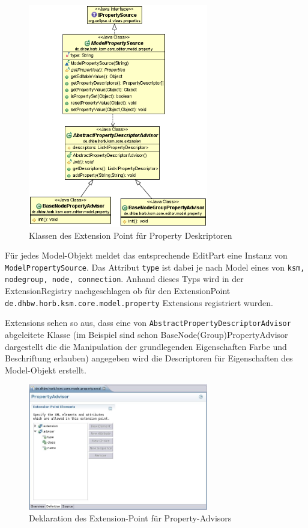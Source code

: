 \documentclass[%
12pt,titlepage,abstracton]{scrreprt}
\begin{document}
\begin{figure}[mt]
\centering
\includegraphics[width=0.7\textwidth]{images/ext-property-descriptors.PNG}
\caption{Klassen des Extension Point für Property Deskriptoren}
\label{fig:ext-property-descriptors}
\end{figure}

Für jedes Model-Objekt meldet das entsprechende EditPart eine Instanz von
\texttt{Model\-Property\-Source}. Das Attribut \texttt{type} ist dabei je nach
Model eines von \texttt{ksm, nodegroup, node, connection}.
Anhand dieses Typs wird in der Extension\-Registry nachgeschlagen ob für den
Extension\-Point \texttt{de.\-dhbw.\-horb.\-ksm.\-core.\-model.\-property}
Extensions registriert wurden.

Extensions sehen so aus, dass eine von
\texttt{Abstract\-Property\-Descriptor\-Advisor} abgeleitete Klasse (im
Beispiel sind schon BaseNode(Group)PropertyAdvisor dargestellt die die
Manipulation der grundlegenden Eigenschaften Farbe und Beschriftung erlauben)
angegeben wird die Descriptoren für Eigenschaften des Model-Objekt erstellt.

\begin{figure}[mt]
\centering
\includegraphics[width=0.7\textwidth]{images/eclipse-property-declaration-extensionpoint.jpg}
\caption{Deklaration des Extension-Point für Property-Advisors}
\label{fig:property-declaration-extensionpoint}
\end{figure}
\end{document}
